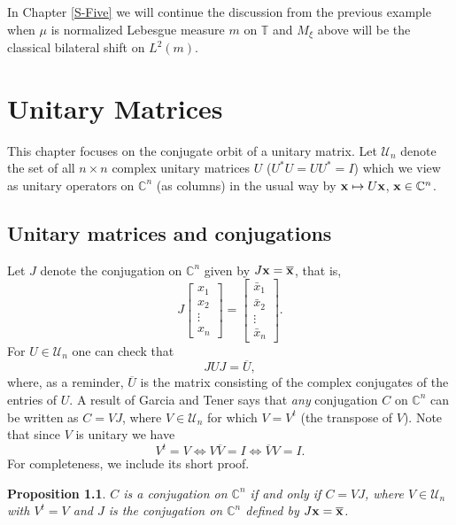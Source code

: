 \documentclass{dis}
\theoremstyle{plain}
\newtheorem{Proposition}[equation]{Proposition}
\theoremstyle{definition}
\def\C{\mathbb{C}}
\def\T{\mathbb{T}}
\renewcommand{\vec}[1]{{\bf #1}}
\newcommand{\0}{{\color{lightgray}0}}
\begin{document}
In Chapter \ref{S-Five} we will continue the discussion from the previous example when $\mu$ is normalized Lebesgue measure $m$ on $\T$ and $M_{\xi}$ above will be the classical bilateral shift on $L^2(m)$. 

\chapter{Unitary Matrices}\label{S-Four}

This chapter focuses on the conjugate orbit of a unitary matrix. Let $\mathscr{U}_{n}$ denote the set of all $n \times n$ complex unitary matrices $U$ ($U^{*} U = U U^{*} = I$) which we view as unitary operators on $\C^n$ (as columns)  in the usual way by $\vec{x} \mapsto U \vec{x}$, $\vec{x} \in \C^n$.


\section{Unitary matrices and conjugations}


Let $J$ denote the conjugation on $\C^n$ given by $J \vec{x} = \overline{\vec{x}}$, that is,
$$J \begin{bmatrix} x_1\\ x_2\\ \vdots\\ x_n \end{bmatrix} = \begin{bmatrix} \bar x_1\\ \bar x_2\\ \vdots\\ \bar x_n \end{bmatrix}.$$
For $U \in \mathscr{U}_{n}$ one  can check that
\begin{equation}\label{youuuu}
J U J = \overline{U},
\end{equation}
where, as a reminder, $\overline{U}$ is the matrix consisting of the complex conjugates of the entries of $U$.
 A result of Garcia and Tener \cite[Lemma 3.2]{MR2966041} says that {\em any} conjugation $C$ on $\C^n$ can be written as $C = V J$, where $V \in \mathscr{U}_{n}$ for which $V = V^{t}$ (the transpose of $V$).
 Note that since $V$ is unitary we have 
 \begin{equation}\label{99hhHHaa1212344}
V^{t} = V \iff V \overline{V} = I \iff  \overline{V} V = I.
\end{equation}
For completeness, we include its short proof. 
 
 \begin{Proposition}\label{GTenner}
$C$ is a conjugation on $\C^n$ if and only if $C = V J$, where $V \in \mathscr{U}_n$ with $V^{t} = V$ and $J$ is the conjugation on $\C^n$ defined by $J \vec{x} = \overline{\vec{x}}$. 
 \end{Proposition}
 
\end{document}
